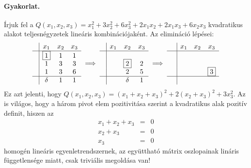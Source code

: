 \documentclass[9pt, a4paper, showtrims]{memoir}
\theoremstyle{plain}
\theoremstyle{remark}
\theoremstyle{definition}
\begin{document}
\paragraph{Gyakorlat.}
Írjuk fel a 
\(
Q\left( x_1,x_2,x_3 \right)=
x_1^2+3x_2^2+6x_3^2+
2x_1x_2+2x_1x_3+
6x_2x_3
\)
kvadratikus alakot teljesnégyzetek lineáris kombinációjaként.
Az elimináció lépései:
\[
\begin{array}{c|ccc}
     & x_1       & x_2 & x_3 \\
     \hline
     & \boxed{1} & 1   & 1   \\
     & 1         & 3   & 3   \\
     & 1         & 3   & 6   \\
    \hline
    & \delta     & 1   & 1
\end{array}
\implies
\begin{array}{c|ccc}
     & x_1& x_2  & x_3 \\
     \hline
     & &                &     \\
     & & \boxed{2}      & 2   \\
     & & 2              & 5   \\
     \hline
     & & \delta         & 1
\end{array}
\implies
\begin{array}{c|ccc}
     & x_1 & x_2 & x_3      \\
     \hline
     &     &     &          \\
     &     &     &          \\
     &     &     & \boxed{3}\\
    \hline
    \phantom{\delta}
\end{array}
\]
Ez azt jelenti, hogy 
\(
Q\left( x_1,x_2,x_3 \right)
=
\left( x_1+x_2+x_3 \right)^2
+2\left( x_2+x_3 \right)^2
+3x_3^2.
\)
Az is világos, hogy a három pivot elem pozitivitása szerint a kvadratikus alak pozitív definit,
hiszen az
\begin{eqnarray*}
    x_1+x_2+x_3&=& 0\\
    x_2+x_3&=& 0\\
    x_3&=& 0
\end{eqnarray*}
homogén lineáris egyenletrendszernek, 
az együttható mátrix oszlopainak lináris függetlensége miatt,
csak triviális megoldása van!
\end{document}
